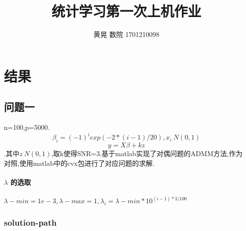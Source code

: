 \documentclass[UTF8]{ctexart}
\author{黄晃 数院 1701210098 }
\title{统计学习第一次上机作业}
\begin{document}
  \maketitle
  \section{结果}
  \subsection{问题一}
  n=100,p=5000.
  $$\beta_i=(-1)^{i}exp(-2*(i-1)/20), x_i ~ N(0,1)$$
  $$ y=X\beta+kz$$
  .其中$z~N(0,1)$,取k使得SNR=3.基于matlab实现了对偶问题的ADMM方法,作为对照,使用matlab中的cvx包进行了对应问题的求解.
  \paragraph{$\lambda$ 的选取}
  $\lambda-min=1e-3,\lambda-max=1,\lambda_i = \lambda-min*10^{(i-1)*3/100}$
  \subsubsection{solution-path}
  
\end{document}
